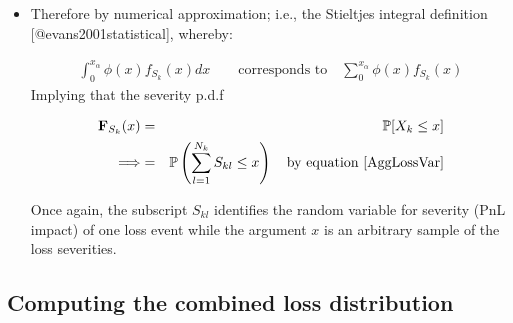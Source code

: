 \documentclass{DissertateUSU}
\begin{document}
\begin{itemize}
\item Therefore by numerical approximation; i.e., the Stieltjes integral definition [@evans2001statistical], whereby:

\singlespacing
\begin{eqnarray}\label{StieltjesInt}
\int_{0}^{x_\alpha} \phi(x)f_{S_{k}}(x)dx \qquad \mbox{corresponds to} \quad \sum_0^{x_\alpha}\phi(x)f_{S_{k}}(x)
\end{eqnarray}
\doublespacing
Implying that the severity p.d.f

\singlespacing
\begin{eqnarray}\label{SeverityDistributionFcn}
\mathbf{F}_{S_{k}}(x) &=& \mathbb{P}[X_k\leq x] \nonumber\\
\Longrightarrow  &=& \mathbb{P}\left(\sum_{l=1}^{N_k}S_{kl} \leq x \right) \quad \mbox{by equation \ref{AggLossVar}}
\end{eqnarray}
\doublespacing

Once again, the subscript $S_{kl}$ identifies the random variable for severity (PnL impact) of one loss event while the argument $x$ is an arbitrary sample of the loss severities.
\end{itemize}

\subsection{Computing the combined loss distribution}
\end{document}
